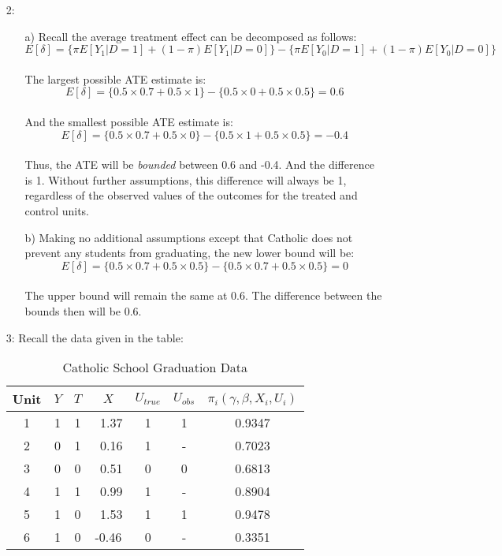\documentclass{article}
\begin{document}
\begin{itemize}
\item[2:]  
\begin{itemize}
\item[a)] Recall the average treatment effect can be decomposed as follows: 
$$E[\delta] = \{\pi E[Y_1 | D =1] + (1-\pi)E[Y_1|D=0] \} - \{\pi E[Y_0
| D =1] + (1-\pi)E[Y_0|D=0] \}$$\\
The largest possible ATE estimate is: 
$$E[\delta]  =\{0.5 \times 0.7 + 0.5 \times 1\} - \{0.5 \times 0 + 0.5 \times 0.5\} = 0.6$$ \\
And the smallest possible ATE estimate is: 
$$E[\delta]  =\{0.5 \times 0.7 + 0.5 \times 0\} - \{0.5 \times 1 + 0.5
\times 0.5\} = -0.4$$ \\
Thus, the ATE will be {\em bounded} between 0.6 and -0.4. And the
difference is 1.  Without further assumptions, this difference will
always be 1, regardless of the observed values of the outcomes for
the treated and control units.
\item[b)] Making no additional assumptions except that Catholic does
  not prevent any students from graduating, the new lower bound will
  be: 
$$E[\delta]  =\{0.5 \times 0.7 + 0.5 \times 0.5\} - \{0.5 \times 0.7 + 0.5
\times 0.5\} = 0$$ \\
The upper bound will remain the same at 0.6. The difference between the bounds then will be 0.6.

\end{itemize}

\item[3:] Recall the data given in the table:

\begin{table}[!h]
		\caption{Catholic School Graduation Data}
	\begin{center}
		\begin{tabular}{cccc|cc|c}
                  Unit & $Y$ & $T$ & $X$ & $U_{true}$ & $U_{obs}$ & $\pi_i(\gamma,\beta,X_i,U_i)$\\ \hline  
                  1    & 1     & 1   &\ 1.37   & 1   & 1  & 0.9347\\ 
                  2    & 0     & 1   &\ 0.16   & 1    & - & 0.7023\\ 
                  3    & 0    &  0    &\ 0.51   & 0   & 0 & 0.6813\\ 
                  4    & 1    &  1    &\ 0.99   & 1  & -  &0.8904\\ 
                  5   &  1    &  0    &\ 1.53   & 1   & 1 &0.9478\\ 
                  6  &  1     &  0     &-0.46   & 0  & - &0.3351\\ 


\end{tabular}
\end{center}
\end{table}
\end{itemize}
\end{document}
